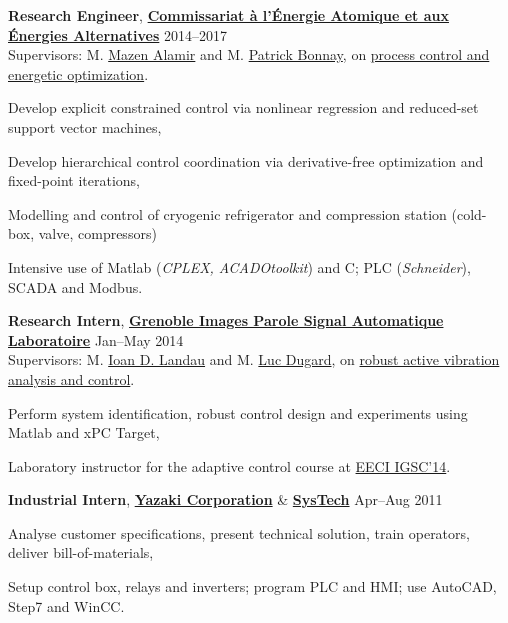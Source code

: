 \documentclass[a4paper,11pt]{article}
\begin{document}
	\textbf{Research Engineer},
	\href{http://www.cea.fr/}{\textbf{Commissariat \`{a} l'\'{E}nergie Atomique et aux \'{E}nergies Alternatives}}
	\hfill {2014--2017}\\
	Supervisors: M. \href{http://www.mazenalamir.fr/home/}{Mazen Alamir} and M. \href{https://www.researchgate.net/profile/P_Bonnay}{Patrick Bonnay}, on \href{https://vuongvtrinh.github.io/project/cryogenic-refrigerator/}{process control and energetic optimization}.
	\begin{innerlist}
		\item Develop explicit constrained control via nonlinear regression and reduced-set support vector machines,
		\item Develop hierarchical control coordination via derivative-free optimization and fixed-point iterations, 
		\item Modelling and control of cryogenic refrigerator and compression station (cold-box, valve, compressors)
		\item Intensive use of Matlab (\emph{CPLEX, ACADOtoolkit}) and C; PLC (\emph{Schneider}), SCADA and Modbus.
	\end{innerlist}
	
	\vspace{0.1cm}
	
	\textbf{Research Intern},
	\href{http://www.gipsa-lab.fr/}{\textbf{Grenoble Images Parole Signal Automatique Laboratoire}}
	\hfill {Jan--May 2014}\\
	Supervisors: M. \href{https://www.gipsa-lab.grenoble-inp.fr/~ioandore.landau/}{Ioan D. Landau} and M. \href{https://www.researchgate.net/profile/Luc_Dugard}{Luc Dugard}, on \href{https://www.gipsa-lab.grenoble-inp.fr/~ioandore.landau/benchmark_adaptive_regulation/}{robust active vibration analysis and control}.
	\begin{innerlist}
		\item Perform system identification, robust control design and experiments using Matlab and xPC Target,
		\item  Laboratory instructor for the adaptive control course at \href{http://www.eeci-igsc.eu/}{EECI IGSC'14}.
	\end{innerlist}
	
	\vspace{0.1cm}
	
	\textbf{Industrial Intern},
	\href{http://www.yhv.com.vn}{\textbf{Yazaki Corporation}} \& \href{https://systech.vn/}{\textbf{SysTech}}
	\hfill {Apr--Aug 2011}
	\begin{innerlist}
		\item Analyse customer specifications, present technical solution, train operators, deliver bill-of-materials,
		\item Setup control box, relays and inverters; program PLC and HMI; use AutoCAD, Step7 and WinCC.
	\end{innerlist}
	
\end{document}
